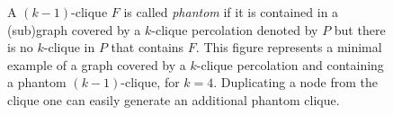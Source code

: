 \begin{figure}
    \caption{
    A $(k-1)$-clique $F$ is called {\em phantom}
    if it is contained in a (sub)graph covered by a 
    $k$-clique percolation denoted by $P$ but 
    there is no $k$-clique in $P$ that contains $F$.
    This figure represents a minimal example
    of a graph covered by a $k$-clique percolation
    and containing a phantom $(k-1)$-clique,
    for $k = 4$. Duplicating a node from the clique
    one can easily generate an additional
    phantom clique.
    }
    \label{gr0}
 \end{figure}

